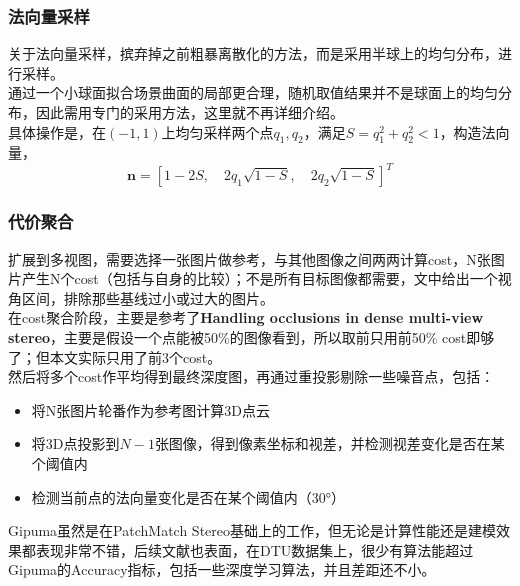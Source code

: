 \subsubsection*{法向量采样}

关于法向量采样，摈弃掉之前粗暴离散化的方法，而是采用半球上的均匀分布，进行采样。\\

通过一个小球面拟合场景曲面的局部更合理，随机取值结果并不是球面上的均匀分布，因此需用专门的采用方法，这里就不再详细介绍。\\

具体操作是，在$(-1,1)$上均匀采样两个点$q_1,q_2$，满足$S = q_1^2 + q_2^2 < 1$，构造法向量，
$$
	\mathbf{n} = \left[1-2S, \quad 2q_1\sqrt{1-S},\quad 2q_2\sqrt{1-S}\right]^T
$$

\subsubsection*{代价聚合}
扩展到多视图，需要选择一张图片做参考，与其他图像之间两两计算cost，N张图片产生N个cost（包括与自身的比较）；不是所有目标图像都需要，文中给出一个视角区间，排除那些基线过小或过大的图片。\\

在cost聚合阶段，主要是参考了\textbf{Handling occlusions in dense multi-view stereo}，主要是假设一个点能被50\%的图像看到，所以取前只用前50\% cost即够了；但本文实际只用了前3个cost。\\

然后将多个cost作平均得到最终深度图，再通过重投影剔除一些噪音点，包括：
\begin{itemize}
	\item 将N张图片轮番作为参考图计算3D点云
	\item 将3D点投影到$N-1$张图像，得到像素坐标和视差，并检测视差变化是否在某个阈值内
	\item 检测当前点的法向量变化是否在某个阈值内（30°）
\end{itemize}

Gipuma虽然是在PatchMatch Stereo基础上的工作，但无论是计算性能还是建模效果都表现非常不错，后续文献也表面，在DTU数据集上，很少有算法能超过Gipuma的Accuracy指标，包括一些深度学习算法，并且差距还不小。
